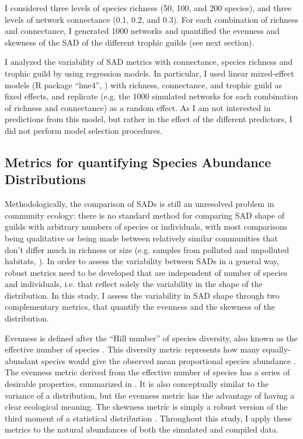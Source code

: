 I considered three levels of species richness (50, 100, and 200 species), and three levels of network connectance (0.1, 0.2, and 0.3). For each combination of richness and connectance, I generated 1000 networks and quantified the evenness and skewness of the SAD of the different trophic guilds (see next section).

I analyzed the variability of SAD metrics with connectance, species richness and trophic guild by using regression models. In particular, I used linear mixed-effect models (R package ``lme4'', \citealt{Bates2015}) with richness, connectance, and trophic guild as fixed effects, and replicate (e.g. the 1000 simulated networks for each combination of richness and connectance) as a random effect. As I am not interested in predictions from this model, but rather in the effect of the different predictors, I did not perform model selection procedures.

\subsection*{Metrics for quantifying Species Abundance Distributions}

Methodologically, the comparison of SADs is still an unresolved problem in community ecology: there is no standard method for comparing SAD shape of guilds with arbitrary numbers of species or individuals, with most comparisons being qualitative \citep{McGill2007} or being made between relatively similar communities that don’t differ much in richness or size (e.g. samples from polluted and unpolluted habitats, \citealt{Matthews2015}). In order to assess the variability between SADs in a general way, robust metrics need to be developed that are independent of number of species and individuals, i.e. that reflect solely the variability in the shape of the distribution. In this study, I assess the variability in SAD shape through two complementary metrics, that quantify the evenness and the skewness of the distribution.

Evenness is defined after the ``Hill number'' of species diversity, also known as the effective number of species \citep{Jost2006}. This diversity metric represents how many equally-abundant species would give the observed mean proportional species abundance \citep{Tuomisto2012}. The evenness metric derived from the effective number of species has a series of desirable properties, summarized in \cite{Smith1996}. It is also conceptually similar to the variance of a distribution, but the evenness metric has the advantage of having a clear ecological meaning. The skewness metric is simply a robust version of the third moment of a statistical distribution \citep{Brys2004}. Throughout this study, I apply these metrics to the natural abundances of both the simulated and compiled data.

